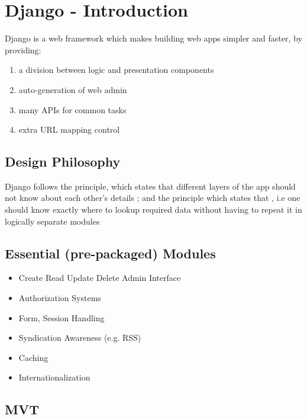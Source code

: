 \section{Django - Introduction}

\par{Django is a web framework which makes building web apps simpler and faster,
by providing:}

\begin{enumerate}
	\item[]{a division between logic and presentation components}
	\item[]{auto-generation of web admin}
	\item[]{many APIs for common tasks}
	\item[]{extra URL mapping control }
\end{enumerate}

\subsection{Design Philosophy}

	\par{Django follows the  principle, which states that
different layers of the app should not know about each other's details ; and the
 principle which states that , i.e one should know exactly where to lookup
required data without having to repeat it in logically separate modules}

\subsection{Essential (pre-packaged) Modules}

\begin{itemize}
	\item[]{Create Read Update Delete Admin Interface}
	\item[]{Authorization Systems}
	\item[]{Form, Session Handling}
	\item[]{Syndication Awareness (e.g. RSS)}
	\item[]{Caching}
	\item[]{Internationalization}
\end{itemize}

\subsection{MVT}

